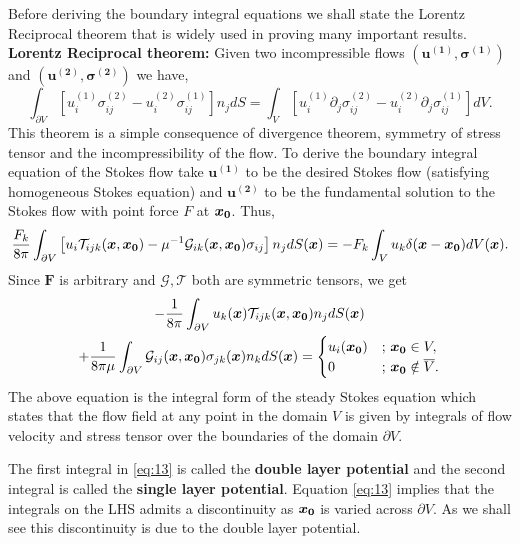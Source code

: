 \documentclass[12pt]{article}
\begin{document}
Before deriving the boundary integral equations we shall state the Lorentz Reciprocal theorem that is widely used in proving many important results.
\newline
\newline
\textbf{Lorentz Reciprocal theorem:} Given two incompressible flows $(\boldsymbol{u^{(1)}}, \boldsymbol{\sigma^{(1)}})$ and $(\boldsymbol{u^{(2)}}, \boldsymbol{\sigma^{(2)}})$	we have,
\begin{equation}
	\label{eq:12}
	\int_{\partial V} \left[ u^{(1)}_i \sigma^{(2)}_{ij}  - u^{(2)}_i \sigma^{(1)}_{ij} \right] n_j dS  = \int_V \left[ u^{(1)}_i \partial_j \sigma^{(2)}_{ij}  - u^{(2)}_i \partial_j \sigma^{(1)}_{ij} \right] dV.
\end{equation}
This theorem is a simple consequence of divergence theorem, symmetry of stress tensor and the incompressibility of the flow. To derive the boundary integral equation of the Stokes flow take $\boldsymbol{u^{(1)}}$ to be the desired Stokes flow (satisfying homogeneous Stokes equation) and $\boldsymbol{u^{(2)}}$ to be the fundamental solution to the Stokes flow with point force $F$ at $\boldsymbol{x_0}$. Thus,
$$
\frac{F_k}{8\pi}\int_{\partial V} \left[ u_i \mathcal{T}_{ijk}(\boldsymbol{x},\boldsymbol{x_0}) - \mu^{-1} \mathcal{G}_{ik}(\boldsymbol{x},\boldsymbol{x_0})  \sigma_{ij} \right] n_j dS(\boldsymbol{x})  = -F_k\int_V u_k \delta(\boldsymbol{x} - \boldsymbol{x_0}) dV(\boldsymbol{x}).
$$
Since $\textbf{F}$ is arbitrary and $\boldsymbol{\mathcal{G}}, \boldsymbol{\mathcal{T}}$ both are symmetric tensors, we get
\begin{multline}
	\label{eq:13}
	-\frac{1}{8\pi}\int_{\partial V} u_k(\boldsymbol{x}) \mathcal{T}_{ijk}(\boldsymbol{x},\boldsymbol{x_0}) n_j dS(\boldsymbol{x}) \\+ \frac{1}{8\pi \mu}\int_{\partial V} \mathcal{G}_{ij}(\boldsymbol{x},\boldsymbol{x_0})  \sigma_{jk}(\boldsymbol{x}) n_k dS(\boldsymbol{x}) = \begin{cases}
		u_i(\boldsymbol{x_0}) & ;\, \boldsymbol{x_0} \in V, \\
		0 & ;\, \boldsymbol{x_0} \notin \overline{V}.
	\end{cases}
\end{multline}
The above equation is the integral form of the steady Stokes equation which states that the flow field at any point in the domain $V$ is given by integrals of flow velocity and stress tensor over the boundaries of the domain $\partial V$.


The first integral in \eqref{eq:13} is called the \textbf{double layer potential} and the second integral is called the \textbf{single layer potential}. Equation \eqref{eq:13} implies that the integrals on the LHS admits a discontinuity as $\boldsymbol{x_0}$ is varied across $\partial V$. As we shall see this discontinuity is due to the double layer potential.
\end{document}

